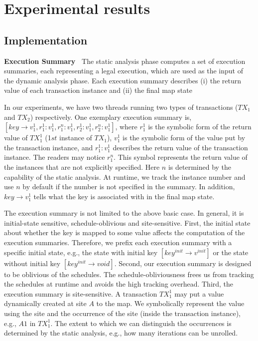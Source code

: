 \section{Experimental results}
\subsection{Implementation}

{\bf Execution Summary\ } The static analysis phase computes a set of execution summaries, each representing a legal execution, which are used as the input of the dynamic analysis phase.
Each execution summary describes (i) the return value of each transaction instance and (ii) the final map state
 

In our experiments,  we have two threads running two types of transactions ($TX_1$ and $TX_2$) respectively. One exemplary execution summary is, $[key\rightarrow v^1_1, r^1_1:v^1_1, r^n_1:v^1_1, r^1_2:v^1_1, r^n_2:v^1_1]$, where $r^1_1$ is the symbolic form of the return value of $TX^1_1$ (1$st$ instance of $TX_1$), $v^1_1$ is the symbolic form of the value put by the transaction instance, and $r^1_1:v^1_1$ describes the return value of the transaction instance. The readers may notice $r^n_1$. This symbol represents the return value of the instances that are not explicitly specified.  Here $n$ is determined by the capability of the static analysis. At runtime, we track the instance number and use $n$ by default if the number is not specified in the summary. In addition, $key\rightarrow v^1_1$ tells what the key is associated with in the final map state. 

The execution summary is not limited to the above basic case. In general, it is initial-state sensitive, schedule-oblivious and site-sensitive. 
First, the initial state about whether the key is mapped to some value affects the computation of the execution summaries. Therefore, we prefix each execution summary with a specific initial state, e.g., the state with initial key $[key^{init}\rightarrow v^{init}]$ or the state without initial key $[key^{init}\rightarrow void]$.
Second, our execution summary is designed to be oblivious of the schedules. The schedule-obliviousness frees us from tracking the schedules at runtime and avoids the high tracking overhead. Third, the execution summary is site-sensitive. A transaction $TX^1_1$ may put a value dynamically created at site $A$ to the map. We symbolically represent the value using the site and the occurrence of the site (inside the transaction instance), e.g., $A1$ in $TX^1_1$. The extent to which we can distinguish the occurrences is determined by the static analysis, e.g., how many iterations can be unrolled.


